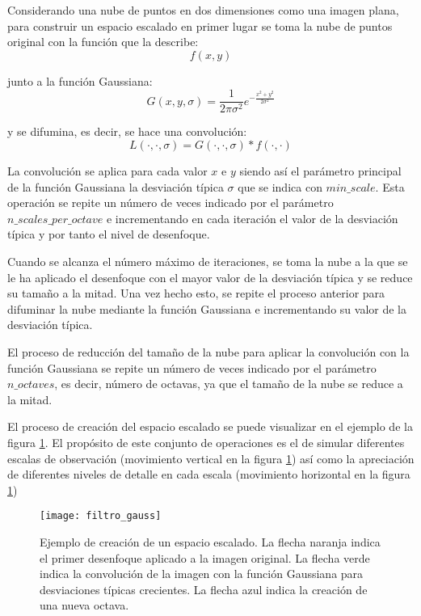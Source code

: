 Considerando una nube de puntos en dos dimensiones como una imagen plana, para construir un espacio escalado en primer lugar se toma la nube de puntos original con la función que la describe: 
$$f(x,y)$$ 

junto a la función Gaussiana:
$$G(x,y,\sigma)=\frac{1}{2\pi\sigma^2}e^{-\frac{x^2+y^2}{2\sigma^2}}$$

y se difumina, es decir, se hace una convolución: 
$$L(\cdot,\cdot,\sigma)=G(\cdot,\cdot,\sigma)*f(\cdot,\cdot)$$

La convolución se aplica para cada valor $x$ e $y$ siendo así el parámetro principal de la función Gaussiana la desviación típica $\sigma$ que se indica con $min\_scale$. Esta operación se repite un número de veces indicado por el parámetro $n\_scales\_per\_octave$ e incrementando en cada iteración el valor de la desviación típica y por tanto el nivel de desenfoque.

Cuando se alcanza el número máximo de iteraciones, se toma la nube a la que se le ha aplicado el desenfoque con el mayor valor de la desviación típica y se reduce su tamaño a la mitad. Una vez hecho esto, se repite el proceso anterior para difuminar la nube mediante la función Gaussiana e incrementando su valor de la desviación típica. 

El proceso de reducción del tamaño de la nube para aplicar la convolución con la función Gaussiana se repite un número de veces indicado por el parámetro $n\_octaves$, es decir, número de octavas, ya que el tamaño de la nube se reduce a la mitad.

El proceso de creación del espacio escalado se puede visualizar en el ejemplo de la figura \ref{fig:filtro_gauss}. El propósito de este conjunto de operaciones es el de simular diferentes escalas de observación (movimiento vertical en la figura \ref{fig:filtro_gauss}) así como la apreciación de diferentes niveles de detalle en cada escala (movimiento horizontal en la figura \ref{fig:filtro_gauss})  

\begin{figure}
\centering
\texttt{[image: filtro\_gauss]}
\caption{Ejemplo de creación de un espacio escalado. La flecha naranja indica el primer desenfoque aplicado a la imagen original. La flecha verde indica la convolución de la imagen con la función Gaussiana para desviaciones típicas crecientes. La flecha azul indica la creación de una nueva octava.}\label{fig:filtro_gauss}
\end{figure}



